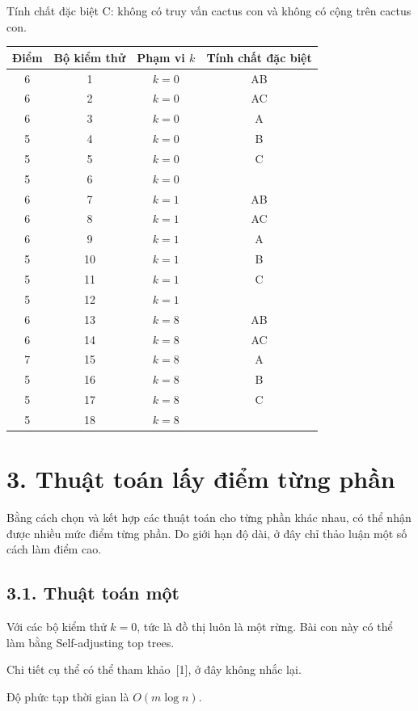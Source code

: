 \documentclass[11pt]{article}
\begin{document}
Tính chất đặc biệt C: không có truy vấn cactus con và không có cộng trên
cactus con.

\begin{center}
\small
\begin{tabular}{c c c c}
\textbf{Điểm} & \textbf{Bộ kiểm thử} & \textbf{Phạm vi \(k\)} &
\textbf{Tính chất đặc biệt} \\
\hline
6 & 1 & \(k=0\) & AB \\
6 & 2 & \(k=0\) & AC \\
6 & 3 & \(k=0\) & A \\
5 & 4 & \(k=0\) & B \\
5 & 5 & \(k=0\) & C \\
5 & 6 & \(k=0\) & \\
6 & 7 & \(k=1\) & AB \\
6 & 8 & \(k=1\) & AC \\
6 & 9 & \(k=1\) & A \\
5 & 10 & \(k=1\) & B \\
5 & 11 & \(k=1\) & C \\
5 & 12 & \(k=1\) & \\
6 & 13 & \(k=8\) & AB \\
6 & 14 & \(k=8\) & AC \\
7 & 15 & \(k=8\) & A \\
5 & 16 & \(k=8\) & B \\
5 & 17 & \(k=8\) & C \\
5 & 18 & \(k=8\) &
\end{tabular}
\end{center}

\section*{3. Thuật toán lấy điểm từng phần}

Bằng cách chọn và kết hợp các thuật toán cho từng phần khác nhau, có thể nhận
được nhiều mức điểm từng phần. Do giới hạn độ dài, ở đây chỉ thảo luận một số
cách làm điểm cao.

\subsection*{3.1. Thuật toán một}

Với các bộ kiểm thử \(k=0\), tức là đồ thị luôn là một rừng. Bài con này có
thể làm bằng Self-adjusting top trees.

Chi tiết cụ thể có thể tham khảo~[1], ở đây không nhắc lại.

Độ phức tạp thời gian là \(O(m\log n)\).
\end{document}

